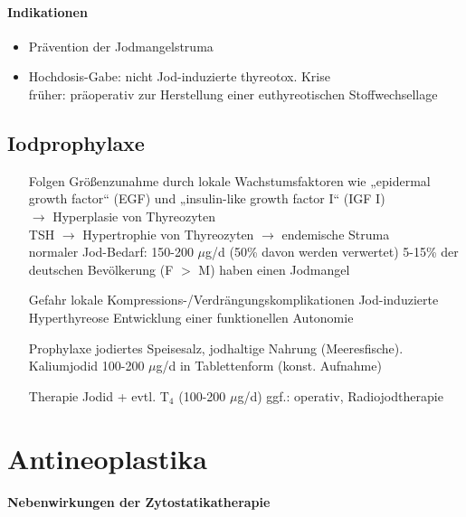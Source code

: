 \documentclass[10pt,a4paper]{report}
\begin{document}
\subsubsection{Indikationen} %
\label{par:indikationen}
\begin{itemize}
	\item Prävention der Jodmangelstruma
	\item Hochdosis-Gabe: nicht Jod-induzierte thyreotox. Krise\\
	früher: präoperativ zur Herstellung einer euthyreotischen Stoffwechsellage
\end{itemize}
\section{Iodprophylaxe} %
\label{sec:iodprophylaxe}
\begin{itemize}
	\item[Folgen] Größenzunahme durch lokale Wachstumsfaktoren wie „epidermal growth factor“ (EGF) und „insulin-like growth factor I“ (IGF I)\\ 
	$\rightarrow$ Hyperplasie von Thyreozyten\\
	TSH $\rightarrow$ Hypertrophie von Thyreozyten $\rightarrow$ endemische Struma  \\
	normaler Jod-Bedarf: 150-200 $\mu$g/d (50\% davon werden verwertet) 5-15\% der deutschen Bevölkerung (F $>$ M) haben einen Jodmangel\\
	\item[Gefahr]lokale Kompressions-/Verdrängungskomplikationen Jod-induzierte Hyperthyreose Entwicklung einer funktionellen Autonomie
	\item [Prophylaxe] jodiertes Speisesalz, jodhaltige Nahrung (Meeresfische). Kaliumjodid 100-200 $\mu$g/d in Tablettenform (konst. Aufnahme)
	\item[Therapie] Jodid + evtl. T$_4$  (100-200 $\mu$g/d) ggf.: operativ, Radiojodtherapie
\end{itemize}
\chapter{Antineoplastika} %
\label{cha:antineoplastika}
\subsubsection{Nebenwirkungen der Zytostatikatherapie} %
\label{par:nebenwirkungen_der_zytostatikatherapie}
\end{document}
